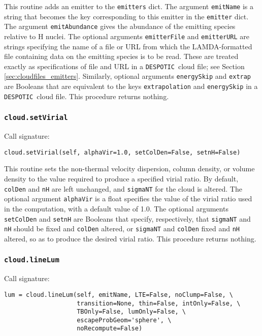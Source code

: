 \documentclass[12pt]{article}
\newcommand{\despotic}{\texttt{DESPOTIC}}
\begin{document}
This routine adds an emitter to the \texttt{emitters} dict. The argument \verb=emitName= is a string that becomes the key corresponding to this emitter in the \verb=emitter= dict. The argument \verb=emitAbundance= gives the abundance of the emitting species relative to H nuclei. The optional arguments \verb=emitterFile= and \verb=emitterURL= are strings specifying the name of a file or URL from which the LAMDA-formatted file containing data on the emitting species is to be read. These are treated exactly as specifications of file and URL in a \despotic\ cloud file; see Section \ref{sec:cloudfiles_emitters}. Similarly, optional arguments \verb=energySkip= and \verb=extrap= are Booleans that are equivalent to the keys \verb=extrapolation= and \verb=energySkip= in a \despotic\ cloud file. This procedure returns nothing.


\subsubsection{\texttt{cloud.setVirial}}

Call signature:

\begin{verbatim}
cloud.setVirial(self, alphaVir=1.0, setColDen=False, setnH=False)
\end{verbatim}

This routine sets the non-thermal velocity dispersion, column density, or volume density to the value required to produce a specified virial ratio. By default, \verb=colDen= and \verb=nH= are left unchanged, and \verb=sigmaNT= for the cloud is altered. The optional argument \verb=alphaVir= is a float specifies the value of the virial ratio used in the computation, with a default value of 1.0. The optional arguments \verb=setColDen= and \verb=setnH= are Booleans that specify, respectively, that \verb=sigmaNT= and \verb=nH= should be fixed and \verb=colDen= altered, or \verb=sigmaNT= and \verb=colDen= fixed and \verb=nH= altered, so as to produce the desired virial ratio. This procedure returns nothing.


\subsubsection{\texttt{cloud.lineLum}}
\label{sec:linelum}

Call signature:

\begin{verbatim}
lum = cloud.lineLum(self, emitName, LTE=False, noClump=False, \
                    transition=None, thin=False, intOnly=False, \
                    TBOnly=False, lumOnly=False, \
                    escapeProbGeom='sphere', \
                    noRecompute=False)
\end{verbatim}
\end{document}

